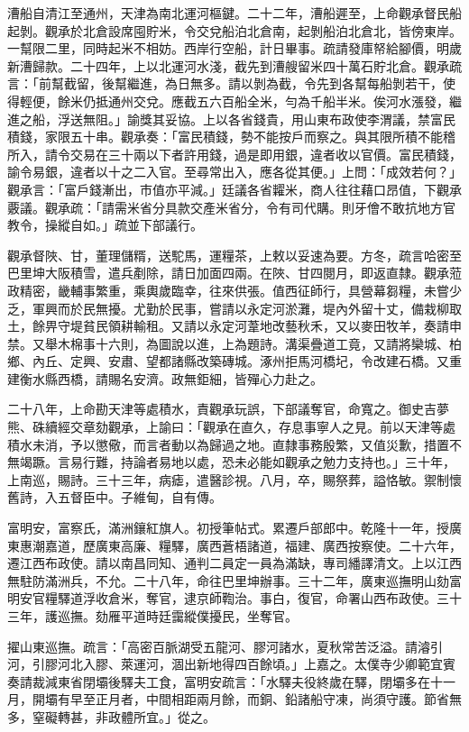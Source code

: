 \begin{pinyinscope}
漕船自清江至通州，天津為南北運河樞鍵。二十二年，漕船遲至，上命觀承督民船起剝。觀承於北倉設席囤貯米，令交兌船泊北倉南，起剝船泊北倉北，皆傍東岸。一幫限二里，同時起米不相妨。西岸行空船，計日畢事。疏請發庫帑給腳價，明歲新漕歸款。二十四年，上以北運河水淺，截先到漕艘留米四十萬石貯北倉。觀承疏言：「前幫截留，後幫繼進，為日無多。請以剝為截，令先到各幫每船剝若干，使得輕便，餘米仍抵通州交兌。應截五六百船全米，勻為千船半米。俟河水漲發，繼進之船，浮送無阻。」諭獎其妥協。上以各省錢貴，用山東布政使李渭議，禁富民積錢，家限五十串。觀承奏：「富民積錢，勢不能按戶而察之。與其限所積不能稽所入，請令交易在三十兩以下者許用錢，過是即用銀，違者收以官價。富民積錢，諭令易銀，違者以十之二入官。至尋常出入，應各從其便。」上問：「成效若何？」觀承言：「富戶錢漸出，市值亦平減。」廷議各省糶米，商人往往藉口昂值，下觀承覈議。觀承疏：「請需米省分具款交產米省分，令有司代購。則牙儈不敢抗地方官教令，操縱自如。」疏並下部議行。

觀承督陜、甘，董理儲糈，送駝馬，運糧茶，上敕以妥速為要。方冬，疏言哈密至巴里坤大阪積雪，遣兵剷除，請日加面四兩。在陜、甘四閱月，即返直隸。觀承蒞政精密，畿輔事繁重，乘輿歲臨幸，往來供張。值西征師行，具營幕芻糧，未嘗少乏，軍興而於民無擾。尤勤於民事，嘗請以永定河淤灘，堤內外留十丈，備栽柳取土，餘畀守堤貧民領耕輸租。又請以永定河葦地改藝秋禾，又以麥田牧羊，奏請申禁。又舉木棉事十六則，為圖說以進，上為題詩。溝渠疊道工竟，又請將欒城、柏鄉、內丘、定興、安肅、望都諸縣改築磚城。涿州拒馬河橋圮，令改建石橋。又重建衡水縣西橋，請賜名安濟。政無鉅細，皆殫心力赴之。

二十八年，上命勘天津等處積水，責觀承玩誤，下部議奪官，命寬之。御史吉夢熊、硃續經交章劾觀承，上諭曰：「觀承在直久，存息事寧人之見。前以天津等處積水未消，予以懲儆，而言者動以為歸過之地。直隸事務殷繁，又值災歉，措置不無竭蹶。言易行難，持論者易地以處，恐未必能如觀承之勉力支持也。」三十年，上南巡，賜詩。三十三年，病瘧，遣醫診視。八月，卒，賜祭葬，謚恪敏。禦制懷舊詩，入五督臣中。子維甸，自有傳。

富明安，富察氏，滿洲鑲紅旗人。初授筆帖式。累遷戶部郎中。乾隆十一年，授廣東惠潮嘉道，歷廣東高廉、糧驛，廣西蒼梧諸道，福建、廣西按察使。二十六年，遷江西布政使。請以南昌同知、通判二員定一員為滿缺，專司繙譯清文。上以江西無駐防滿洲兵，不允。二十八年，命往巴里坤辦事。三十二年，廣東巡撫明山劾富明安官糧驛道浮收倉米，奪官，逮京師鞫治。事白，復官，命署山西布政使。三十三年，護巡撫。劾雁平道時廷靄縱僕擾民，坐奪官。

擢山東巡撫。疏言：「高密百脈湖受五龍河、膠河諸水，夏秋常苦泛溢。請濬引河，引膠河北入膠、萊運河，涸出新地得四百餘頃。」上嘉之。太僕寺少卿範宜賓奏請裁減東省閉壩後驛夫工食，富明安疏言：「水驛夫役終歲在驛，閉壩多在十一月，開壩有早至正月者，中間相距兩月餘，而銅、鉛諸船守凍，尚須守護。節省無多，窒礙轉甚，非政體所宜。」從之。


\end{pinyinscope}
